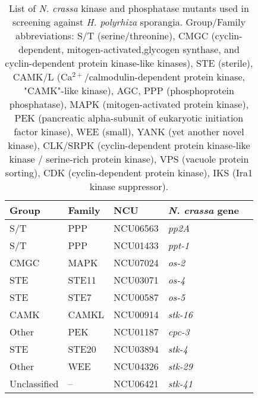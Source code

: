 
\begin{table}[tbp]
\caption[List of \textit{N. crassa} mutants screened for sensitivity]{List of \textit{N. crassa} kinase and phosphatase mutants used in screening against \textit{H. polyrhiza} sporangia. Group/Family abbreviations: S/T (serine/threonine), CMGC (cyclin-dependent, mitogen-activated,glycogen synthase, and cyclin-dependent protein kinase-like kinases), STE (sterile), CAMK/L (Ca$^{2+}$/calmodulin-dependent protein kinase, "CAMK"-like kinase), AGC, PPP (phosphoprotein phosphatase), MAPK (mitogen-activated protein kinase), PEK (pancreatic alpha-subunit of eukaryotic initiation factor kinase), WEE (small), YANK (yet another novel kinase), CLK/SRPK (cyclin-dependent protein kinase-like kinase / serine-rich protein kinase), VPS (vacuole protein sorting), CDK (cyclin-dependent protein kinase), IKS (Ira1 kinase suppressor).} 
\label{tab:ChInhib_Kinase}
\begin{tabular}{lllll}
  \hline
  Group & Family & NCU & \emph{N. crassa} gene \\ 
  \hline
 S/T & PPP & NCU06563 & \emph{pp2A} \\ 
  S/T & PPP & NCU01433 & \emph{ppt-1} \\ 
  CMGC & MAPK & NCU07024 & \emph{os-2} \\ 
  STE & STE11 & NCU03071 & \emph{os-4} \\ 
  STE & STE7 & NCU00587 & \emph{os-5} \\ 
  CAMK & CAMKL & NCU00914 & \emph{stk-16} \\ 
  Other & PEK & NCU01187 & \emph{cpc-3} \\ 
  STE & STE20 & NCU03894 & \emph{stk-4} \\ 
  Other & WEE & NCU04326 & \emph{stk-29} \\ 
  Unclassified & -- & NCU06421 & \emph{stk-41} \\ 

\end{tabular}
\end{table}
